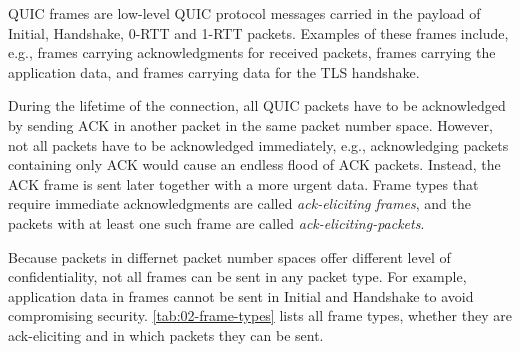 QUIC frames are low-level QUIC protocol messages carried in the payload of Initial, Handshake, 0-RTT
and 1-RTT packets. Examples of these frames include, e.g., \ACK{} frames carrying acknowledgments
for received packets, \STREAM{} frames carrying the application data, and \CRYPTO{} frames carrying
data for the TLS handshake.

During the lifetime of the connection, all QUIC packets have to be acknowledged by sending ACK in
another packet in the same packet number space. However, not all packets have to be acknowledged
immediately, e.g., acknowledging packets containing only ACK would cause an endless flood of ACK
packets. Instead, the ACK frame is sent later together with a more urgent data. Frame types that
require immediate acknowledgments are called \textit{ack-eliciting frames}, and the packets with at
least one such frame are called \textit{\glspl{ack-eliciting-packet}}.

Because packets in differnet packet number spaces offer different level of confidentiality, not all
frames can be sent in any packet type. For example, application data in \STREAM{} frames cannot be
sent in Initial and Handshake to avoid compromising security. \autoref{tab:02-frame-types} lists all
frame types, whether they are ack-eliciting and in which packets they can be sent.


